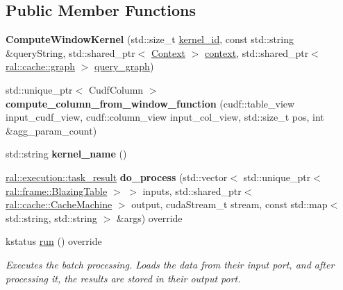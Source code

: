 \subsection*{Public Member Functions}
\begin{DoxyCompactItemize}
\item 
\mbox{\label{classral_1_1batch_1_1ComputeWindowKernel_a1feff9b400748b38a36a91d7f256cd35}} 
{\bfseries Compute\+Window\+Kernel} (std\+::size\+\_\+t \hyperlink{classral_1_1cache_1_1kernel_a2fd708656cb056a41ec635b8bdc4acfe}{kernel\+\_\+id}, const std\+::string \&query\+String, std\+::shared\+\_\+ptr$<$ \hyperlink{classblazingdb_1_1manager_1_1Context}{Context} $>$ \hyperlink{classral_1_1cache_1_1kernel_af0347d14d678cfa7205c1387746a2e1b}{context}, std\+::shared\+\_\+ptr$<$ \hyperlink{classral_1_1cache_1_1graph}{ral\+::cache\+::graph} $>$ \hyperlink{classral_1_1cache_1_1kernel_a5fbb02292aff165a28ef25e75f0d89bd}{query\+\_\+graph})
\item 
\mbox{\label{classral_1_1batch_1_1ComputeWindowKernel_a045546d30ebc87491d69757f8547c672}} 
std\+::unique\+\_\+ptr$<$ Cudf\+Column $>$ {\bfseries compute\+\_\+column\+\_\+from\+\_\+window\+\_\+function} (cudf\+::table\+\_\+view input\+\_\+cudf\+\_\+view, cudf\+::column\+\_\+view input\+\_\+col\+\_\+view, std\+::size\+\_\+t pos, int \&agg\+\_\+param\+\_\+count)
\item 
\mbox{\label{classral_1_1batch_1_1ComputeWindowKernel_a8caa7fbdb505758f1bcc465024a5cffa}} 
std\+::string {\bfseries kernel\+\_\+name} ()
\item 
\mbox{\label{classral_1_1batch_1_1ComputeWindowKernel_a26873276168cdd25b055c313a50c0d2f}} 
\hyperlink{structral_1_1execution_1_1task__result}{ral\+::execution\+::task\+\_\+result} {\bfseries do\+\_\+process} (std\+::vector$<$ std\+::unique\+\_\+ptr$<$ \hyperlink{classral_1_1frame_1_1BlazingTable}{ral\+::frame\+::\+Blazing\+Table} $>$ $>$ inputs, std\+::shared\+\_\+ptr$<$ \hyperlink{classral_1_1cache_1_1CacheMachine}{ral\+::cache\+::\+Cache\+Machine} $>$ output, cuda\+Stream\+\_\+t stream, const std\+::map$<$ std\+::string, std\+::string $>$ \&args) override
\item 
kstatus \hyperlink{classral_1_1batch_1_1ComputeWindowKernel_a22a36fbcb21dad09bad9300e21dc4825}{run} () override
\begin{DoxyCompactList}\small\item\em Executes the batch processing. Loads the data from their input port, and after processing it, the results are stored in their output port. \end{DoxyCompactList}\end{DoxyCompactItemize}
